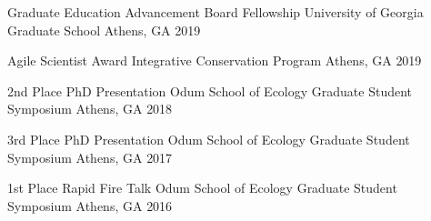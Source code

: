 



\begin{cvhonors}
  \cvhonor
    {Graduate Education Advancement Board Fellowship}
    {University of Georgia Graduate School}
    {Athens, GA}
    {2019}

  \cvhonor
    {Agile Scientist Award}
    {Integrative Conservation Program}
    {Athens, GA}
    {2019}

  \cvhonor
    {2nd Place PhD Presentation}
    {Odum School of Ecology Graduate Student Symposium}
    {Athens, GA}
    {2018}

  \cvhonor
    {3rd Place PhD Presentation}
    {Odum School of Ecology Graduate Student Symposium}
    {Athens, GA}
    {2017}

  \cvhonor
    {1st Place Rapid Fire Talk} %
    {Odum School of Ecology Graduate Student Symposium} %
    {Athens, GA} %
    {2016} %

\end{cvhonors}

\medskip

